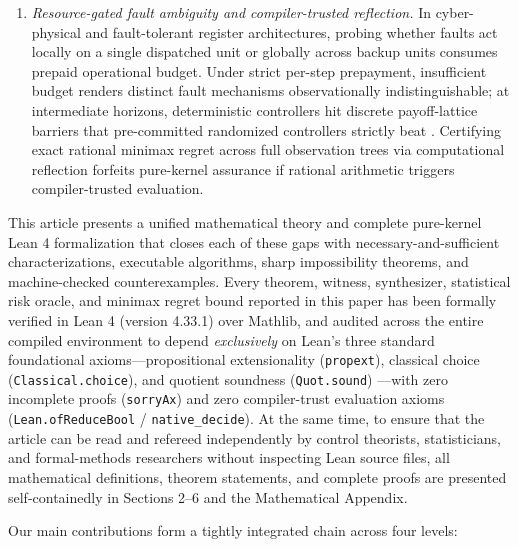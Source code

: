\documentclass[11pt,a4paper]{article}
\begin{document}
\begin{enumerate}
\item
  \emph{Resource-gated fault ambiguity and compiler-trusted reflection.}
  In cyber-physical and fault-tolerant register architectures, probing
  whether faults act locally on a single dispatched unit or globally
  across backup units consumes prepaid operational budget. Under strict
  per-step prepayment, insufficient budget renders distinct fault
  mechanisms observationally indistinguishable; at intermediate
  horizons, deterministic controllers hit discrete payoff-lattice
  barriers that pre-committed randomized controllers strictly beat
  \citep{vonNeumann1928, wald1950, savage1951}. Certifying exact
  rational minimax regret across full observation trees via
  computational reflection \citep{boutin1997, gregoireMahboubi2005}
  forfeits pure-kernel assurance if rational arithmetic triggers
  compiler-trusted evaluation.
\end{enumerate}

This article presents a unified mathematical theory and complete
pure-kernel Lean 4 formalization \citep{mouraUllrich2021, mathlib2020}
that closes each of these gaps with necessary-and-sufficient
characterizations, executable algorithms, sharp impossibility theorems,
and machine-checked counterexamples. Every theorem, witness,
synthesizer, statistical risk oracle, and minimax regret bound reported
in this paper has been formally verified in Lean 4 (version 4.33.1) over
Mathlib, and audited across the entire compiled environment to depend
\emph{exclusively} on Lean's three standard foundational
axioms---propositional extensionality (\texttt{propext}), classical
choice (\texttt{Classical.choice}), and quotient soundness
(\texttt{Quot.sound}) \citep{carneiro2019}---with zero incomplete proofs
(\texttt{sorryAx}) and zero compiler-trust evaluation axioms
(\texttt{Lean.ofReduceBool} / \texttt{native\_decide}). At the same
time, to ensure that the article can be read and refereed independently
by control theorists, statisticians, and formal-methods researchers
without inspecting Lean source files, all mathematical definitions,
theorem statements, and complete proofs are presented self-containedly
in Sections 2--6 and the Mathematical Appendix.

Our main contributions form a tightly integrated chain across four
levels:
\end{document}
